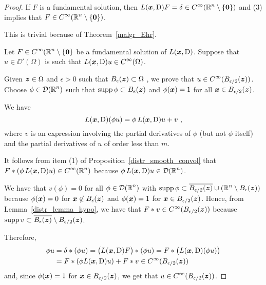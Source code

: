 \begin{proof}
If $F$ is a fundamental solution, then
$\displaystyle L({\bm{x}},\operatorname{D})F = \delta \in C^\infty(\mathbb{R}^n
\setminus \{{\bm{0}}\})$ and (3)
implies that $\displaystyle F \in C^\infty(\mathbb{R}^n \setminus \{{\bm{0}}\})$.

This is trivial because of Theorem~\ref{malgr_Ehr}.

Let $\displaystyle F \in C^\infty(\mathbb{R}^n\setminus \{{\bm{0}}\}$ be a fundamental
solution of $L({\bm{x}},\operatorname{D})$.  Suppose that $u\in \DD'(\Omega)$ is such that
$\displaystyle L({\bm{x}},\operatorname{D})u \in C^\infty(\Omega)$.

Given ${\bm{z}} \in \Omega$ and $\epsilon >0$ such that
$\displaystyle B_\epsilon({\bm{z}}) \subset \Omega$ , we prove that
$\displaystyle u \in C^\infty(B_{\epsilon/2}({\bm{z}}))$.  Choose
$\displaystyle \phi \in \mathcal{D}(\mathbb{R}^n)$ such that
$\displaystyle \operatorname{supp} \phi \subset B_\epsilon({\bm{z}})$ and
$\phi({\bm{x}})=1$ for all $\displaystyle {\bm{x}} \in B_{\epsilon/2}({\bm{z}})$.

We have
\[
L({\bm{x}},\operatorname{D})(\phi u) = \phi\, L({\bm{x}},\operatorname{D})u + v \  ,
\]
where $v$ is an expression involving the partial derivatives of $\phi$
(but not $\phi$ itself) and the partial derivatives of $u$ of order
less than $m$.

It follows from item (1) of Proposition~\ref{distr_smooth_convol} that
$\displaystyle F\ast (\phi \, L({\bm{x}},\operatorname{D})u) \in C^\infty(\mathbb{R}^n)$ because
$\displaystyle \phi\,L({\bm{x}},\operatorname{D})u \in \mathcal{D}(\mathbb{R}^n)$.

We have that $v(\phi) = 0$ for all $\displaystyle \phi \in \mathcal{D}(\mathbb{R}^n)$ with
$\displaystyle \operatorname{supp} \phi \subset \overline{B_{\epsilon/2}({\bm{z}})}
\cup \left( \mathbb{R}^n \setminus B_\epsilon({\bm{z}}) \right)$
because $\phi({\bm{x}})=0$ for
$\displaystyle {\bm{x}} \not\in B_\epsilon({\bm{z}})$ and $\phi({\bm{x}})=1$ for
$\displaystyle {\bm{x}} \in B_{\epsilon/2}({\bm{z}})$.  Hence, from
Lemma~\ref{distr_lemma_hypo}, we have that
$\displaystyle F\ast v \in C^\infty(B_{\epsilon/2}({\bm{z}}))$ 
because $\displaystyle \operatorname{supp} v \subset \overline{B_\epsilon({\bm{z}})} \setminus
B_{\epsilon/2}({\bm{z}})$.

Therefore,
\begin{align*}
\phi u &= \delta \ast (\phi u) = \big(L({\bm{x}},\operatorname{D}) F\big) \ast (\phi u)
= F \ast \big( L({\bm{x}},\operatorname{D})(\phi u) \big) \\
&= F \ast (\phi L({\bm{x}},\operatorname{D}) u)
+ F\ast v \in C^\infty(B_{\epsilon/2}({\bm{z}}))
\end{align*}
and, since $\phi({\bm{x}}) = 1$ for
$\displaystyle {\bm{x}} \in B_{\epsilon/2}({\bm{z}})$, we get that
$\displaystyle u \in C^\infty(B_{\epsilon/2}({\bm{z}}))$.
\end{proof}

